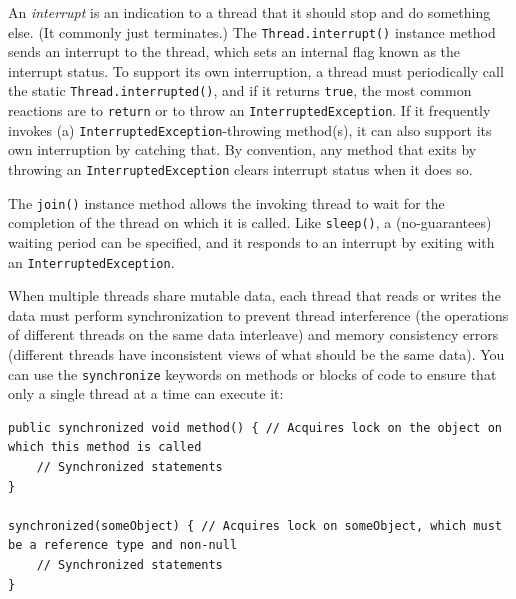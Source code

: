 \documentclass[table, xcdraw]{article}%
\begin{document}
An \emph{interrupt} is an indication to a thread that it should stop and do something else. (It commonly just terminates.) The \texttt{Thread.interrupt()} instance method sends an interrupt to the thread, which sets an internal flag known as the interrupt status. To support its own interruption, a thread must periodically call the static \texttt{Thread.interrupted()}, and if it returns \texttt{true}, the most common reactions are to \texttt{return} or to throw an \texttt{InterruptedException}. If it frequently invokes (a) \texttt{InterruptedException}-throwing method(s), it can also support its own interruption by catching that. By convention, any method that exits by throwing an \texttt{InterruptedException} clears interrupt status when it does so.

The \texttt{join()} instance method allows the invoking thread to wait for the completion of the thread on which it is called. Like \texttt{sleep()}, a (no-guarantees) waiting period can be specified, and it responds to an interrupt by exiting with an \texttt{InterruptedException}.

When multiple threads share mutable data, each thread that reads or writes the data must perform synchronization to prevent thread interference (the operations of different threads on the same data interleave) and memory consistency errors (different threads have inconsistent views of what should be the same data). You can use the \texttt{synchronize} keywords on methods or blocks of code to ensure that only a single thread at a time can execute it:

\begin{verbatim}
public synchronized void method() { // Acquires lock on the object on which this method is called
    // Synchronized statements
}

synchronized(someObject) { // Acquires lock on someObject, which must be a reference type and non-null
    // Synchronized statements
}
\end{verbatim}
\end{document}
